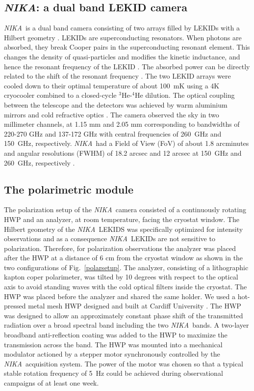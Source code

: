 \documentclass[twocolumn, traditabstract]{aa}
\newcommand{\nika}{{\it NIKA}}
\begin{document}
\subsection{\nika: a dual band LEKID camera}
 \nika\ is a dual band camera consisting of two arrays filled by LEKIDs with a Hilbert geometry
 \citep{roesch}. LEKIDs are superconducting resonators. When photons are
 absorbed, they break Cooper pairs in the superconducting resonant element. This
 changes the density of quasi-particles and modifies the kinetic inductance, and
 hence the resonant frequency of the LEKID \citep{Doyle2008}. The absorbed power
 can be directly related to the shift of the resonant frequency
 \citep{Calvo2013}. The two LEKID arrays were cooled down to their optimal
 temperature of about 100~mK using a 4K cryocooler combined to a closed-cycle
 $^3$He-$^4$He dilution. The optical coupling between the telescope and the
 detectors was achieved by warm aluminium mirrors and cold refractive optics
 \citep{catalano2014}. The camera observed the sky in two millimeter channels,
 at 1.15 mm and 2.05 mm corresponding to bandwidths of 220-270 GHz and 137-172 GHz
 with central frequencies of 260~GHz and 150~GHz, respectively. \nika\ had a
 Field of View (FoV) of about 1.8 arcminutes and angular resolutions (FWHM) of
 18.2 arcsec and 12 arcsec at 150~GHz and 260~GHz, respectively
 \citep{catalano2014, adam2014}.
\subsection{The polarimetric module}
\label{sec:pol_module}
The polarization setup of the \nika\ camera consisted of a continuously rotating
HWP and an analyzer, at room temperature, facing the cryostat window. The
Hilbert geometry \citep{roesch} of the \nika\ LEKIDS was specifically optimized
for intensity observations and as a consequence \nika\ LEKIDs are not sensitive
to polarization. Therefore, for polarization observations the analyzer was placed
after the HWP at a distance of 6 cm from the cryostat window as shown in the two
configurations of Fig.~\ref{polarsetup}. The analyzer, consisting of a
lithographic kapton coper polarimeter, was tilted by 10 degrees with
respect to the optical axis to avoid standing waves with the cold optical
filters inside the cryostat. The HWP was placed before the analyzer and
  shared the same holder.  We used a hot-pressed metal mesh HWP designed and
built at Cardiff University \citep{pisano}. The HWP was designed to
allow an approximately constant phase shift of the transmitted radiation
over a broad spectral band including the two \nika\ bands. A two-layer broadband
anti-reflection coating was added to the HWP to maximize the transmission across
the band. The HWP was mounted into a mechanical modulator actioned by a stepper
motor synchronously controlled by the \nika\ acquisition system. The power of
the motor was chosen so that a typical stable rotation frequency of 5~Hz could
be achieved during observational campaigns of at least one week. 
\end{document}
